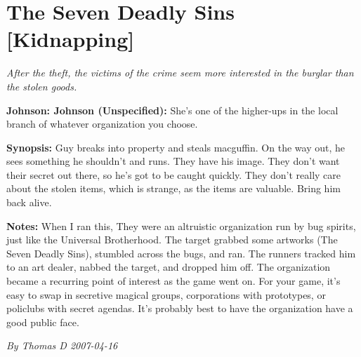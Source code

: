 \documentclass[letterpaper,twocolumn,10.5pt]{article}
\newenvironment{scenario}[6]
	{
		\section{#1 {\small[#2]}}
		\textit{#3}
		\def\TMPSCENARIO{#4 #5}
	}
	{\small\textit{By \TMPSCENARIO}}
\newcommand{\johnson}[2]{\textbf{Johnson: #1 (#2):}}
\newcommand{\synopsis}{\textbf{Synopsis: }}
\newcommand{\notes}{\textbf{Notes: }}
\begin{document}
\begin{scenario}{The Seven Deadly Sins}
	{Kidnapping}
	{ After the theft, the victims of the crime seem more interested in the burglar than the stolen goods.}
	{Thomas D}
	{2007-04-16}
	{https://forum.rpg.net/showthread.php?321504-Shadowrun-4th-101-Instant-Scenarios\&p=7176128#post7176128}

\johnson{Johnson}{Unspecified} She's one of the higher-ups in the local branch of whatever organization you choose. 

\synopsis Guy breaks into property and steals macguffin. On the way out, he sees something he shouldn't and runs. They have his image. They don't want their secret out there, so he's got to be caught quickly. They don't really care about the stolen items, which is strange, as the items are valuable. Bring him back alive.

\notes When I ran this, They were an altruistic organization run by bug spirits, just like the Universal Brotherhood. The target grabbed some artworks (The Seven Deadly Sins), stumbled across the bugs, and ran. The runners tracked him to an art dealer, nabbed the target, and dropped him off. The organization became a recurring point of interest as the game went on. For your game, it's easy to swap in secretive magical groups, corporations with prototypes, or policlubs with secret agendas. It's probably best to have the organization have a good public face. 

\end{scenario}
\end{document}
